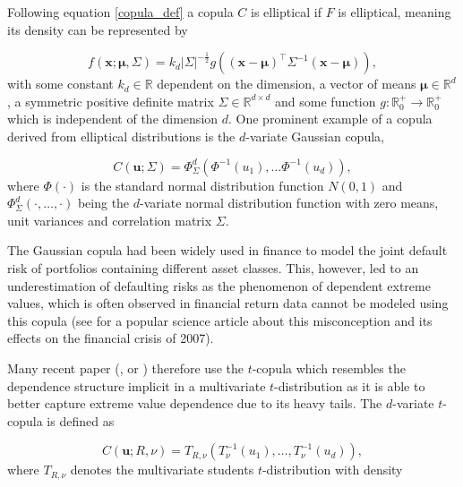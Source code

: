 Following equation \ref{copula_def} a copula $C$ is elliptical if $F$ is elliptical, meaning its density can be represented by

\begin{equation}
	f(\mathbf{x}; \boldsymbol{\mu},\Sigma)=k_{d}|\Sigma|^{-\frac{1}{2}} g\left((\mathbf{x}-\boldsymbol{\mu})^{\top} \Sigma^{-1}(\mathbf{x}-\boldsymbol{\mu})\right),
\end{equation}
%
with some constant $k_{d} \in \mathbb{R}$ dependent on the dimension, a vector of means $\boldsymbol{\mu} \in \mathbb{R}^{d}$, a symmetric positive definite matrix $\Sigma \in \mathbb{R}^{d\times d}$ and some function $g: \mathbb{R}_{0}^{+} \rightarrow \mathbb{R}_{0}^{+}$ which is independent of the dimension $d$. One prominent example of a copula derived from elliptical distributions is the $d$-variate Gaussian copula, 

\begin{equation}
	C\left(\mathbf{u}; \Sigma\right)=\Phi_{\Sigma}^{d}\left(\Phi^{-1}\left(u_{1}\right), \dots \Phi^{-1}\left(u_{d}\right)\right),
\end{equation}
%
where $\Phi (\cdot)$ is the standard normal distribution function $N(0,1)$ and $\Phi_{\Sigma}^{d} (\cdot,\dots,\cdot)$ being the $d$-variate normal distribution function with zero means, unit variances and correlation matrix $\Sigma$.

The Gaussian copula had been widely used in finance to model the joint default risk of portfolios containing different asset classes. This, however, led to an underestimation of defaulting risks as the phenomenon of dependent extreme values, which is often observed in financial return data cannot be modeled using this copula (see \citet{salmon2012formula} for a popular science article about this misconception and its effects on the financial crisis of 2007).

Many recent paper (\citet{mashal2003dependence}, \citet{breymann2003dependence} or \citet{lucas2014conditional}) therefore use the $t$-copula which resembles the dependence structure implicit in a multivariate $t$-distribution as it is able to better capture extreme value dependence due to its heavy tails. The $d$-variate $t$-copula is defined as

\begin{equation}
	C(\mathbf{u}; R, \nu)=T_{R, \nu}\left(T_{\nu}^{-1}\left(u_{1}\right),\dots, T_{\nu}^{-1}\left(u_{d}\right)\right),
\end{equation}
%
where $T_{R, \nu}$ denotes the multivariate students $t$-distribution with density


